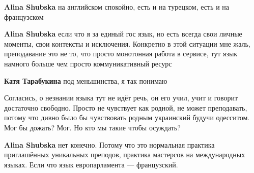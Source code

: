 \begin{itemize}
\begin{itemize}
 

\textbf{Alina Shubska} на английском спокойно, есть и на турецком, есть и на французском

 

\textbf{Alina Shubska} если что я за единый гос язык, но есть всегда свои личные моменты, свои контексты и исключения. Конкретно в этой ситуации мне жаль, преподавание это не то, что просто монотонная работа в сервисе, тут язык намного больше чем просто коммуникативный ресурс

 

\textbf{Катя Тарабукина} под меньшинства, я так понимаю

 

Согласись, о незнании языка тут не идёт речь, он его учил, учит и говорит достаточно свободно. Просто не чувствует как родной, не может преподавать, потому что дивно было бы чувствовать родным украинский будучи одесситом. Мог бы дожать? Мог. Но кто мы такие чтобы осуждать?

 

\textbf{Alina Shubska} нет конечно. Потому что это нормальная практика приглашённых уникальных преподов, практика мастерсов на международных языках. Если что язык европарламента — французский.

 


\end{itemize}
\end{itemize}
